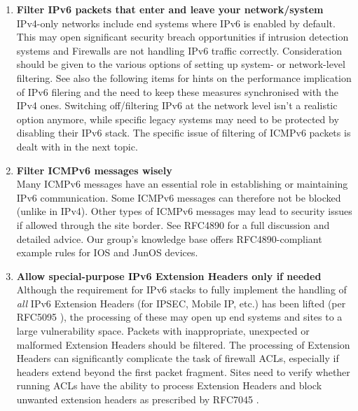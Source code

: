 \begin{enumerate}
\item {\bf Filter IPv6 packets that enter and leave your network/system}\\
IPv4-only networks include end systems where IPv6 is enabled by default.
This may open significant security breach opportunities
if intrusion detection systems and Firewalls are not handling IPv6 traffic correctly.
Consideration should be given to the various options of setting
up system- or network-level filtering. See also the following items
for hints on the performance implication of IPv6 filering and the
need to keep these measures synchronised with the IPv4 ones.
Switching off/filtering IPv6 at the network level isn't a realistic
option anymore, while specific legacy systems may need to be protected
by disabling their IPv6 stack.
The specific issue of filtering of ICMPv6 packets is dealt with in the
next topic. 


\item {\bf Filter ICMPv6 messages wisely} \\
Many ICMPv6 messages have an essential role in establishing or maintaining
IPv6 communication.
Some ICMPv6 messages can therefore not be blocked (unlike in IPv4).
Other types of ICMPv6 messages may lead to security issues if allowed through
the site border. See RFC4890 \cite{rfc} for a full discussion and detailed advice.
Our group's knowledge base \cite{ipv6wg} offers RFC4890-compliant example
rules for IOS and JunOS devices.


\item {\bf Allow special-purpose IPv6 Extension Headers only if needed} \\
Although the requirement for IPv6 stacks to fully implement the handling
of {\it all} IPv6 Extension Headers (for IPSEC, Mobile IP, etc.) has been lifted
(per RFC5095 \cite{rfc}),
the processing of these may open up end systems and sites to a large
vulnerability space. 
Packets with inappropriate, unexpected or malformed Extension Headers should
be filtered. The processing of Extension Headers can significantly complicate the
task of firewall ACLs, especially if headers extend beyond the first packet
fragment.
Sites need to verify whether running ACLs have the ability to process Extension
Headers and block unwanted extension headers as prescribed by RFC7045
\cite{rfc}.



\end{enumerate}
